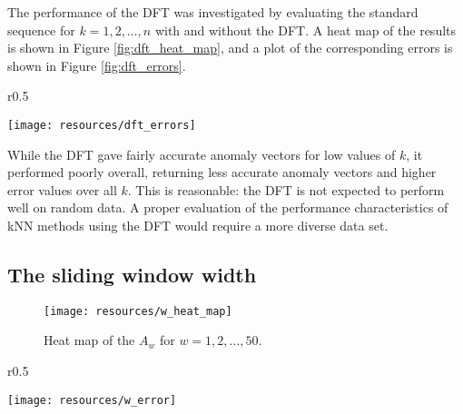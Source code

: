 The performance of the DFT was investigated by evaluating the standard sequence for $k = 1,2,\dots, n$ with and without the DFT. A heat map of the results is shown in Figure \ref{fig:dft_heat_map}, and a plot of the corresponding errors is shown in Figure \ref{fig:dft_errors}.

\begin{wrapfigure}{r}{0.5\textwidth}
    \vspace{-30pt}
    \begin{center}
        \texttt{[image: resources/dft\_errors]}
    \end{center}
    \vspace{-20pt}
    \caption{\small{Errors of the $A_{k, t}$.}}
    \vspace{-10pt}
    \label{fig:dft_errors}
\end{wrapfigure}

While the DFT gave fairly accurate anomaly vectors for low values of $k$, it performed poorly overall, returning less accurate anomaly vectors and higher error values over all $k$. This is reasonable: the DFT is not expected to perform well on random data. A proper evaluation of the performance characteristics of kNN methods using the DFT would require a more diverse data set.

\clearpage

\subsection{The sliding window width}
\FloatBarrier
\label{sect:w}

\begin{figure}[h]
    \vspace{-15pt}
    \begin{center}
        \texttt{[image: resources/w\_heat\_map]}
    \end{center}
    \vspace{-20pt}
    \caption{\small{Heat map of the $A_w$ for $w = 1, 2, \dots, 50$.}}
    \vspace{-10pt}
    \label{fig:w_heat_map}
\end{figure}

\begin{wrapfigure}{r}{0.5\textwidth}
    \vspace{-20pt}
    \begin{center}
        \texttt{[image: resources/w\_error]}
    \end{center}
    \vspace{-20pt}
    \caption{\small{Errors for the anomaly vectors $A_w$.}}
    \label{fig:w_error}
    \vspace{-20pt}
\end{wrapfigure}

